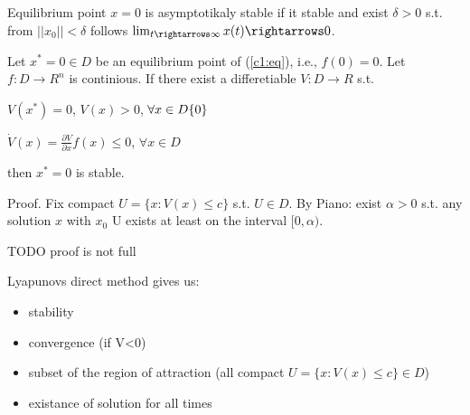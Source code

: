 Equilibrium point $x=0$ is asymptotikaly stable if it stable and exist $\delta>0$
s.t. from $||x_0||<\delta$ follows 
$\lim_{t\rightarrows \infty}x(t) \rightarrows 0$.


Let $x^*=0 \in D$ be an equilibrium point of (\ref{c1:eq}), i.e., $f(0)=0.$ Let
$f: D \rightarrow R^n$ is continious. If there exist a differetiable 
$V:D\rightarrow R$ s.t. 
\begin{enumerable}
\item $V(x^*)=0$, $V(x)>0$, $\forall x \in D\\ \{0\}$
\item $\dot V(x) = \frac{\partial V}{\partial x}f(x) \le 0$, $\forall x \in D$
\end{enumerable}

then $x^*=0$ is stable.

Proof. Fix compact $U=\{x:V(x)\le c\}$ s.t. $U\in D$. By Piano: exist $\alpha > 0$
s.t. any solution $x$ with $x_0$ \in U exists at least on the interval
$[0,\alpha)$.

TODO proof is not full


Lyapunovs direct method gives us:
\begin{itemize}
 \item stability
 \item convergence (if V<0)
 \item subset of the region of attraction (all compact $U=\{x:V(x)\le c\} \in D$)
 \item existance of solution for all times
\end{itemize}

 

